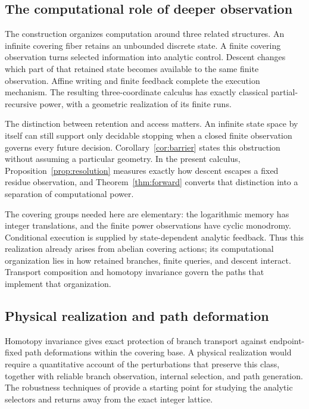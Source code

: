 \documentclass[11pt]{article}
\numberwithin{equation}{section}
\theoremstyle{definition}
\theoremstyle{remark}
\begin{document}
\subsection{The computational role of deeper observation}

The construction organizes computation around three related structures.
An infinite covering fiber retains an unbounded discrete state. A
finite covering observation turns selected information into analytic
control. Descent changes which part of that retained state becomes
available to the same finite observation. Affine writing and finite
feedback complete the execution mechanism. The resulting three-coordinate
calculus has exactly classical partial-recursive power, with a geometric
realization of its finite runs.

The distinction between retention and access matters. An infinite
state space by itself can still support only decidable stopping when
a closed finite observation governs every future decision.
Corollary~\ref{cor:barrier} states this obstruction without assuming
a particular geometry. In the present calculus,
Proposition~\ref{prop:resolution} measures exactly how descent escapes
a fixed residue observation, and Theorem~\ref{thm:forward} converts
that distinction into a separation of computational power.

The covering groups needed here are elementary: the logarithmic
memory has integer translations, and the finite power observations
have cyclic monodromy. Conditional execution is supplied by
state-dependent analytic feedback. Thus this realization already
arises from abelian covering actions; its computational organization
lies in how retained branches, finite queries, and descent interact.
Transport composition and homotopy invariance govern the paths that
implement that organization.

\subsection{Physical realization and path deformation}

Homotopy invariance gives exact protection of branch transport against
endpoint-fixed path deformations within the covering base. A physical
realization would require a quantitative account of the perturbations
that preserve this class, together with reliable branch observation,
internal selection, and path generation. The robustness techniques of
\cite{gracaCampagnoloBuescu2005,gracaZhong2023} provide a starting point
for studying the analytic selectors and returns away from the exact
integer lattice.
\end{document}
